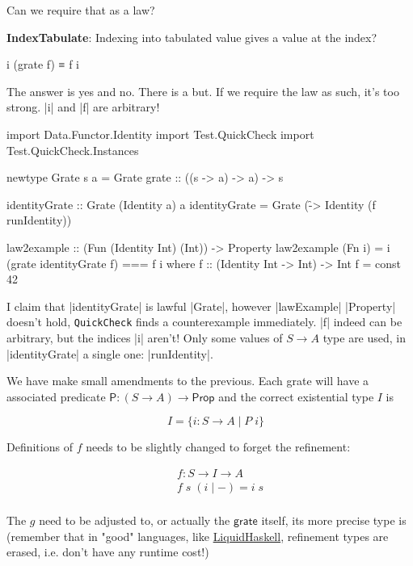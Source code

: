 \documentclass{article}
\begin{document}
Can we require that as a law?

\textbf{IndexTabulate}: Indexing into tabulated value gives a value at the index?

\begin{code}
i (grate f) ≡ f i
\end{code}

The answer is yes and no. There is a but. If we require the law as such,
it's too strong. |i| and |f| are arbitrary!

\begin{code}
import Data.Functor.Identity
import Test.QuickCheck
import Test.QuickCheck.Instances

newtype Grate s a = Grate { grate :: ((s -> a) -> a) -> s }

identityGrate :: Grate (Identity a) a
identityGrate = Grate (\f -> Identity (f runIdentity))

law2example :: (Fun (Identity Int) (Int)) -> Property
law2example (Fn i) = i (grate identityGrate f) === f i where
    f :: (Identity Int -> Int) -> Int
    f = const 42
\end{code}

I claim that |identityGrate| is lawful |Grate|, however |lawExample| |Property|
doesn't hold, \texttt{QuickCheck} finds a counterexample immediately.
|f| indeed can be arbitrary, but the indices |i| aren't!
Only some values of $S \to A$ type are used, in |identityGrate| a single one: |runIdentity|.

We have make small amendments to the previous. Each grate will have a
associated predicate $\mathsf{P} : (S \to A) \to \mathsf{Prop}$ and the correct
existential type $I$ is

\begin{equation}
\quad  I = \{ i : S \to A \mid P\; i \}
\end{equation}

Definitions of $f$ needs to be slightly changed to forget the refinement:

\begin{equation}
\begin{aligned}
\quad &f : S \to I \to A \\
      &f\; s\; (i \mid -)= i\; s \\
\end{aligned}
\end{equation}

The $g$ need to be adjusted to, or actually the $\mathsf{grate}$ itself,
its more precise type is (remember that in "good" languages,
like \href{https://ucsd-progsys.github.io/liquidhaskell-blog/}{LiquidHaskell},
refinement types are erased, i.e. don't have any runtime cost!)
\end{document}
